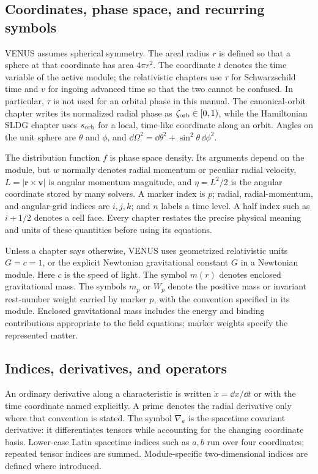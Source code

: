 \subsection{Coordinates, phase space, and recurring symbols}

VENUS assumes spherical symmetry.  The areal radius \(r\) is defined so that
a sphere at that coordinate has area \(4\pi r^2\).  The coordinate \(t\)
denotes the time variable of the active module; the relativistic chapters use
\(\tau\) for Schwarzschild time and \(v\) for ingoing advanced time so that the
two cannot be confused.  In particular, \(\tau\) is not used for an orbital
phase in this manual.  The canonical-orbit chapter writes its normalized
radial phase as \(\zeta_{\rm orb}\in[0,1)\), while the Hamiltonian SLDG
chapter uses \(s_{\rm orb}\) for a local, time-like coordinate along an
orbit.  Angles on the unit sphere are \(\theta\) and \(\phi\), and
\(\dd\Omega^2=\dd\theta^2+\sin^2\theta\,\dd\phi^2\).

The distribution function \(f\) is phase space density.  Its arguments depend
on the module, but \(w\) normally denotes radial momentum or peculiar radial
velocity, \(L=|\bm r\times\bm v|\) is angular momentum magnitude, and
\(\eta=L^2/2\) is the angular coordinate stored by many solvers.  A marker
index is \(p\); radial, radial-momentum, and angular-grid indices are
\(i,j,k\); and \(n\) labels a time level.  A half index such as \(i+1/2\)
denotes a cell face.  Every chapter restates the precise physical meaning and
units of these quantities before using its equations.

Unless a chapter says otherwise, VENUS uses geometrized relativistic units
\(G=c=1\), or the explicit Newtonian gravitational constant \(G\) in a
Newtonian module.  Here \(c\) is the speed of light.  The symbol \(m(r)\)
denotes enclosed gravitational mass. The symbols \(m_p\) or \(W_p\) denote
the positive mass or invariant rest-number weight carried by marker \(p\),
with the convention specified in its module. Enclosed gravitational mass
includes the energy and binding contributions appropriate to the field
equations; marker weights specify the represented matter.

\subsection{Indices, derivatives, and operators}

An ordinary derivative along a characteristic is written \(\dot x=\dd x/\dd t\) or with the time coordinate
named explicitly.  A prime denotes the radial derivative only where that
convention is stated.  The symbol \(\nabla_a\) is the spacetime covariant
derivative: it differentiates tensors while accounting for the changing
coordinate basis.  Lower-case Latin spacetime indices such as \(a,b\) run
over four coordinates; repeated tensor indices are summed.  Module-specific
two-dimensional indices are defined where introduced.

